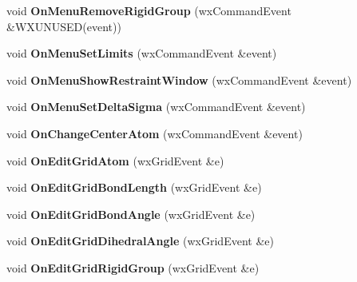 \begin{DoxyCompactItemize}
void {\bfseries On\+Menu\+Remove\+Rigid\+Group} (wx\+Command\+Event \&W\+X\+U\+N\+U\+S\+ED(event))
\item 
\mbox{\label{class_obj_cryst_1_1_w_x_molecule_a62766f2621cf0b02fc43d9837ffd1e9e}} 
void {\bfseries On\+Menu\+Set\+Limits} (wx\+Command\+Event \&event)
\item 
\mbox{\label{class_obj_cryst_1_1_w_x_molecule_a04c1ba4eea3c12e616845fddfe5553e1}} 
void {\bfseries On\+Menu\+Show\+Restraint\+Window} (wx\+Command\+Event \&event)
\item 
\mbox{\label{class_obj_cryst_1_1_w_x_molecule_a2ea30924e60e764ebe5a2068903a0dac}} 
void {\bfseries On\+Menu\+Set\+Delta\+Sigma} (wx\+Command\+Event \&event)
\item 
\mbox{\label{class_obj_cryst_1_1_w_x_molecule_a6c7d9eedb57c708ab7beee02e899e0bc}} 
void {\bfseries On\+Change\+Center\+Atom} (wx\+Command\+Event \&event)
\item 
\mbox{\label{class_obj_cryst_1_1_w_x_molecule_aaa33600d60e0216ecd47af8430b072fd}} 
void {\bfseries On\+Edit\+Grid\+Atom} (wx\+Grid\+Event \&e)
\item 
\mbox{\label{class_obj_cryst_1_1_w_x_molecule_ac0d973e42c5124e8718cebc58174f4f3}} 
void {\bfseries On\+Edit\+Grid\+Bond\+Length} (wx\+Grid\+Event \&e)
\item 
\mbox{\label{class_obj_cryst_1_1_w_x_molecule_a47e7c95b206903ca007793631788e0f0}} 
void {\bfseries On\+Edit\+Grid\+Bond\+Angle} (wx\+Grid\+Event \&e)
\item 
\mbox{\label{class_obj_cryst_1_1_w_x_molecule_a69fadbe109e32276089a3bf26e7eaf16}} 
void {\bfseries On\+Edit\+Grid\+Dihedral\+Angle} (wx\+Grid\+Event \&e)
\item 
\mbox{\label{class_obj_cryst_1_1_w_x_molecule_a5f73ebb7b6c64ef34f53cc8fd37f2033}} 
void {\bfseries On\+Edit\+Grid\+Rigid\+Group} (wx\+Grid\+Event \&e)

\end{DoxyCompactItemize}
